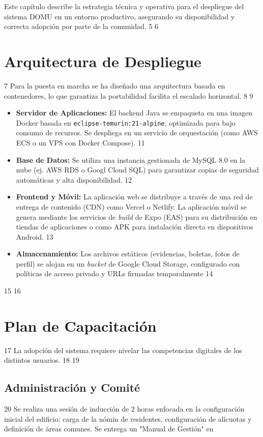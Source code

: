  Este capítulo describe la estrategia técnica y operativa para el despliegue del sistema DOMU en un entorno
      productivo, asegurando su disponibilidad y correcta adopción por parte de la comunidad.
    5
    6 \section{Arquitectura de Despliegue}
    7 Para la puesta en marcha se ha diseñado una arquitectura basada en contenedores, lo que garantiza la portabilidad
      facilita el escalado horizontal.
    8
    9 \begin{itemize}
   10     \item \textbf{Servidor de Aplicaciones:} El backend Java se empaqueta en una imagen Docker basada en
      \texttt{eclipse-temurin:21-alpine}, optimizada para bajo consumo de recursos. Se despliega en un servicio de
      orquestación (como AWS ECS o un VPS con Docker Compose).
   11     \item \textbf{Base de Datos:} Se utiliza una instancia gestionada de MySQL 8.0 en la nube (ej. AWS RDS o Googl
      Cloud SQL) para garantizar copias de seguridad automáticas y alta disponibilidad.
   12     \item \textbf{Frontend y Móvil:} La aplicación web se distribuye a través de una red de entrega de contenido
      (CDN) como Vercel o Netlify. La aplicación móvil se genera mediante los servicios de \textit{build} de Expo (EAS)
      para su distribución en tiendas de aplicaciones o como APK para instalación directa en dispositivos Android.
   13     \item \textbf{Almacenamiento:} Los archivos estáticos (evidencias, boletas, fotos de perfil) se alojan en un
      \textit{bucket} de Google Cloud Storage, configurado con políticas de acceso privado y URLs firmadas temporalmente
   14 \end{itemize}
   15
   16 \section{Plan de Capacitación}
   17 La adopción del sistema requiere nivelar las competencias digitales de los distintos usuarios.
   18
   19 \subsection{Administración y Comité}
   20 Se realiza una sesión de inducción de 2 horas enfocada en la configuración inicial del edificio: carga de la nómin
      de residentes, configuración de alícuotas y definición de áreas comunes. Se entrega un "Manual de Gestión" en
